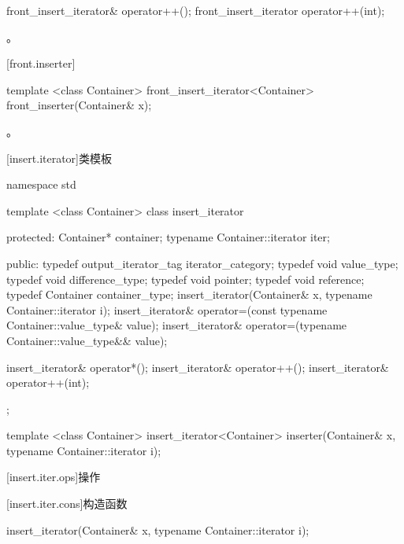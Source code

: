 %
\begin{itemdecl}
front_insert_iterator& operator++();
front_insert_iterator  operator++(int);
\end{itemdecl}

\begin{itemdescr}
\pnum
\returns
{}。
\end{itemdescr}

[front.inserter]{}

%
\begin{itemdecl}
template <class Container>
  front_insert_iterator<Container> front_inserter(Container& x);
\end{itemdecl}

\begin{itemdescr}
\pnum
\returns
{}。
\end{itemdescr}

[insert.iterator]{类模板}

%
\begin{codeblock}
namespace std {
  template <class Container>
  class insert_iterator {
  protected:
    Container* container;
    typename Container::iterator iter;

  public:
    typedef output_iterator_tag iterator_category;
    typedef void value_type;
    typedef void difference_type;
    typedef void pointer;
    typedef void reference;
    typedef Container container_type;
    insert_iterator(Container& x, typename Container::iterator i);
    insert_iterator& operator=(const typename Container::value_type& value);
    insert_iterator& operator=(typename Container::value_type&& value);

    insert_iterator& operator*();
    insert_iterator& operator++();
    insert_iterator& operator++(int);
  };

  template <class Container>
    insert_iterator<Container> inserter(Container& x, typename Container::iterator i);
}
\end{codeblock}

[insert.iter.ops]{操作}

[insert.iter.cons]{构造函数}

%
\begin{itemdecl}
insert_iterator(Container& x, typename Container::iterator i);
\end{itemdecl}

